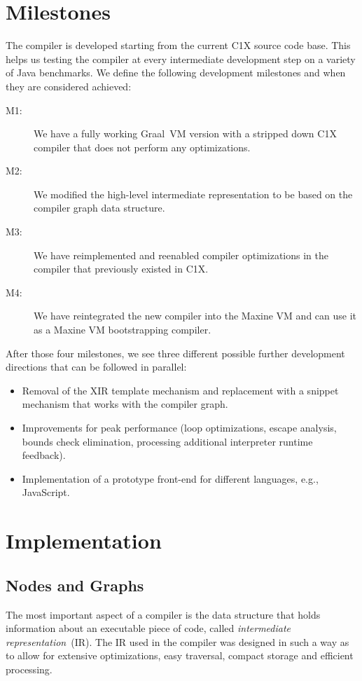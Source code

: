 \documentclass[twocolumn]{svjour3}
\begin{document}
\section{Milestones}
The compiler is developed starting from the current C1X source code base.
This helps us testing the compiler at every intermediate development step on a variety of Java benchmarks.
We define the following development milestones and when they are considered achieved:
\begin{description}
\item[M1:] We have a fully working Graal~VM version with a stripped down C1X compiler that does not perform any optimizations.
\item[M2:] We modified the high-level intermediate representation to be based on the compiler graph data structure.
\item[M3:] We have reimplemented and reenabled compiler optimizations in the compiler that previously existed in C1X.
\item[M4:] We have reintegrated the new compiler into the Maxine VM and can use it as a Maxine VM bootstrapping compiler.
\end{description}

After those four milestones, we see three different possible further development directions that can be followed in parallel:
\begin{itemize}
  \item Removal of the XIR template mechanism and replacement with a snippet mechanism that works with the compiler graph.
  \item Improvements for peak performance (loop optimizations, escape analysis, bounds check elimination, processing additional interpreter runtime feedback).
  \item Implementation of a prototype front-end for different languages, e.g., JavaScript.
\end{itemize}

\section{Implementation}

\subsection{Nodes and Graphs}
The most important aspect of a compiler is the data structure that holds information about an executable piece of code, called \emph{intermediate representation}~(IR).
The IR used in the compiler was designed in such a way as to allow for extensive optimizations, easy traversal, compact storage and efficient processing.
\end{document}
